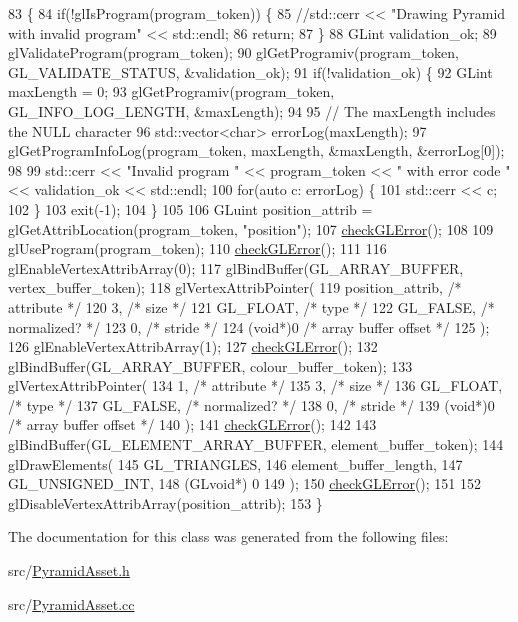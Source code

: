 \begin{DoxyCode}
83                                             \{
84   \textcolor{keywordflow}{if}(!glIsProgram(program\_token)) \{
85     \textcolor{comment}{//std::cerr << "Drawing Pyramid with invalid program" << std::endl;}
86     \textcolor{keywordflow}{return};
87   \}
88   GLint validation\_ok;
89   glValidateProgram(program\_token);
90   glGetProgramiv(program\_token, GL\_VALIDATE\_STATUS, &validation\_ok);
91   \textcolor{keywordflow}{if}(!validation\_ok) \{
92     GLint maxLength = 0;
93     glGetProgramiv(program\_token, GL\_INFO\_LOG\_LENGTH, &maxLength);
94 
95     \textcolor{comment}{// The maxLength includes the NULL character}
96     std::vector<char> errorLog(maxLength);
97     glGetProgramInfoLog(program\_token, maxLength, &maxLength, &errorLog[0]);
98 
99     std::cerr << \textcolor{stringliteral}{"Invalid program "} << program\_token << \textcolor{stringliteral}{" with error code "} << validation\_ok << std::endl;
100     \textcolor{keywordflow}{for}(\textcolor{keyword}{auto} c: errorLog) \{
101       std::cerr << c;
102     \}
103     exit(-1);
104   \}
105 
106   GLuint position\_attrib = glGetAttribLocation(program\_token, \textcolor{stringliteral}{"position"});
107   \hyperlink{_pyramid_asset_8cc_a75f201b0e53e68726854997957322b8d}{checkGLError}();
108 
109   glUseProgram(program\_token);
110   \hyperlink{_pyramid_asset_8cc_a75f201b0e53e68726854997957322b8d}{checkGLError}();
111 
116   glEnableVertexAttribArray(0);
117   glBindBuffer(GL\_ARRAY\_BUFFER, vertex\_buffer\_token);
118   glVertexAttribPointer(
119     position\_attrib,        \textcolor{comment}{/* attribute */}
120     3,        \textcolor{comment}{/* size */}
121     GL\_FLOAT,   \textcolor{comment}{/* type */}
122     GL\_FALSE,   \textcolor{comment}{/* normalized? */}
123     0,        \textcolor{comment}{/* stride */}
124     (\textcolor{keywordtype}{void}*)0    \textcolor{comment}{/* array buffer offset */}
125   );
126   glEnableVertexAttribArray(1);
127   \hyperlink{_pyramid_asset_8cc_a75f201b0e53e68726854997957322b8d}{checkGLError}();
132   glBindBuffer(GL\_ARRAY\_BUFFER, colour\_buffer\_token);
133   glVertexAttribPointer(
134     1,        \textcolor{comment}{/* attribute */}
135     3,        \textcolor{comment}{/* size */}
136     GL\_FLOAT,   \textcolor{comment}{/* type */}
137     GL\_FALSE,   \textcolor{comment}{/* normalized? */}
138     0,        \textcolor{comment}{/* stride */}
139     (\textcolor{keywordtype}{void}*)0    \textcolor{comment}{/* array buffer offset */}
140   );
141   \hyperlink{_pyramid_asset_8cc_a75f201b0e53e68726854997957322b8d}{checkGLError}();
142 
143   glBindBuffer(GL\_ELEMENT\_ARRAY\_BUFFER, element\_buffer\_token);
144   glDrawElements(
145     GL\_TRIANGLES,
146     element\_buffer\_length,
147     GL\_UNSIGNED\_INT,
148     (GLvoid*) 0
149   );
150   \hyperlink{_pyramid_asset_8cc_a75f201b0e53e68726854997957322b8d}{checkGLError}();
151 
152   glDisableVertexAttribArray(position\_attrib);
153 \}
\end{DoxyCode}


The documentation for this class was generated from the following files\+:\begin{DoxyCompactItemize}
\item 
src/\hyperlink{_pyramid_asset_8h}{Pyramid\+Asset.\+h}\item 
src/\hyperlink{_pyramid_asset_8cc}{Pyramid\+Asset.\+cc}\end{DoxyCompactItemize}
